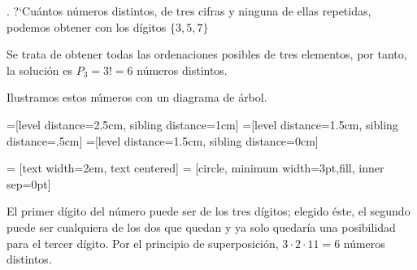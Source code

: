 \begin{example}
	. ?`Cuántos números distintos, de tres cifras y ninguna de ellas repetidas, podemos obtener con los dígitos $ \{ 3,5,7 \} $	
	
	\vspace{3mm} Se trata de obtener todas las ordenaciones posibles de tres elementos, por tanto, la solución es $P_3=3!=6$ números distintos.
	
	Ilustramos estos números con un diagrama de árbol.
	
	\vspace{4mm}
=[level distance=2.5cm, sibling distance=1cm]
=[level distance=1.5cm, sibling distance=.5cm]
=[level distance=1.5cm, sibling distance=0cm]

 = [text width=2em, text centered]
 = [circle, minimum width=3pt,fill, inner sep=0pt]


\begin{center}
\end{center}
\end{example}

\begin{small}
	\textcolor{gris}{El primer dígito del número puede ser de los tres dígitos; elegido éste, el segundo puede ser cualquiera de los dos que quedan y ya solo quedaría una posibilidad para el tercer dígito. Por el principio de superposición, $3\cdot 2 \cdot 1 1=6$ números distintos.}	
	\end{small}

